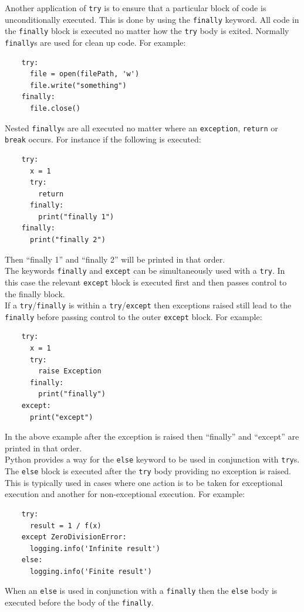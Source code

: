 \documentclass[12pt, titlepage]{article}
\begin{document}
\indent Another application of \texttt{try} is to ensure that a particular block of code is unconditionally executed. This is done by using the \texttt{finally} keyword. All code in the \texttt{finally} block is executed no matter how the \texttt{try} body is exited. Normally \texttt{finally}s are used for clean up code. For example:
\begin{lstlisting}
    try:
      file = open(filePath, 'w')
      file.write("something")
    finally:
      file.close()
\end{lstlisting}
\indent Nested \texttt{finally}s are all executed no matter where an \texttt{exception}, \texttt{return} or \texttt{break} occurs. For instance if the following is executed:
\begin{lstlisting}
    try:
      x = 1
      try:
        return
      finally:
        print("finally 1")
    finally:
      print("finally 2")
\end{lstlisting}
Then ``finally 1'' and ``finally 2'' will be printed in that order. \\
\indent The keywords \texttt{finally} and \texttt{except} can be simultaneously used with a \texttt{try}. In this case the relevant \texttt{except} block is executed first and then passes control to the finally block. \\
\indent If a \texttt{try}/\texttt{finally} is within a \texttt{try}/\texttt{except} then exceptions raised still lead to the \texttt{finally} before passing control to the outer \texttt{except} block. For example:
\begin{lstlisting}
    try:
      x = 1
      try:
        raise Exception
      finally:
        print("finally")
    except:
      print("except")
\end{lstlisting}
In the above example after the exception is raised then ``finally'' and ``except'' are printed in that order. \\
\indent Python provides a way for the \texttt{else} keyword to be used in conjunction with \texttt{try}s. The \texttt{else} block is executed after the \texttt{try} body providing no exception is raised. This is typically used in cases where one action is to be taken for exceptional execution and another for non-exceptional execution. For example:
\begin{lstlisting}
    try:
      result = 1 / f(x)
    except ZeroDivisionError:
      logging.info('Infinite result')
    else:
      logging.info('Finite result')
\end{lstlisting}
When an \texttt{else} is used in conjunction with a \texttt{finally} then the \texttt{else} body is executed before the body of the \texttt{finally}. \\
\end{document}
